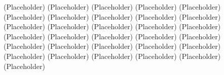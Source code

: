 \newpage
(Placeholder)
\newpage
(Placeholder)
\newpage
(Placeholder)
\newpage
(Placeholder)
\newpage
(Placeholder)
\newpage
(Placeholder)
\newpage
(Placeholder)
\newpage
(Placeholder)
\newpage
(Placeholder)
\newpage
(Placeholder)
\newpage
(Placeholder)
\newpage
(Placeholder)
\newpage
(Placeholder)
\newpage
(Placeholder)
\newpage
(Placeholder)
\newpage
(Placeholder)
\newpage
(Placeholder)
\newpage
(Placeholder)
\newpage
(Placeholder)
\newpage
(Placeholder)
\newpage
(Placeholder)
\newpage
(Placeholder)
\newpage
(Placeholder)
\newpage
(Placeholder)
\newpage
(Placeholder)
\newpage
(Placeholder)
\newpage
(Placeholder)
\newpage
(Placeholder)
\newpage
(Placeholder)
\newpage
(Placeholder)
\newpage
(Placeholder)
\newpage